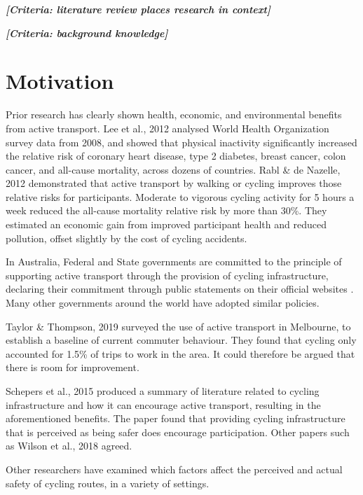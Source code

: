 \documentclass[11pt,twoside]{report}
\newcommand{\remark}[1]{{\bf \em [\marginpar{$\Leftarrow$}#1]}}
\begin{document}
\remark{Criteria: literature review places research in context}

\remark{Criteria: background knowledge}

\section{Motivation}

Prior research has clearly shown health, economic, and environmental benefits from active transport.  Lee et al., 2012 \cite{LEE2012219} analysed World Health Organization survey data from 2008, and showed that physical inactivity significantly increased the relative risk of coronary heart disease, type 2 diabetes, breast cancer, colon cancer, and all-cause mortality, across dozens of countries.  Rabl \& de Nazelle, 2012 \cite{RABL2012121} demonstrated that active transport by walking or cycling improves those relative risks for participants.  Moderate to vigorous cycling activity for 5 hours a week reduced the all-cause mortality relative risk by more than 30\%.  They estimated an economic gain from improved participant health and reduced pollution, offset slightly by the cost of cycling accidents.

In Australia, Federal and State governments are committed to the principle of supporting active transport through the provision of cycling infrastructure, declaring their commitment through public statements on their official websites \cite{federal_policy_2019} \cite{state_policy_2020}.  Many other governments around the world have adopted similar policies.

Taylor \& Thompson, 2019 \cite{melbactive} surveyed the use of active transport in Melbourne, to establish a baseline of current commuter behaviour.  They found that cycling only accounted for 1.5\% of trips to work in the area.  It could therefore be argued that there is room for improvement.

Schepers et al., 2015 \cite{SCHEPERS2015460} produced a summary of literature related to cycling infrastructure and how it can encourage active transport, resulting in the aforementioned benefits.  The paper found that providing cycling infrastructure that is perceived as being safer does encourage participation.  Other papers such as Wilson et al., 2018 \cite{WILSON2018234} agreed.

Other researchers have examined which factors affect the perceived and actual safety of cycling routes, in a variety of settings.
\end{document}
